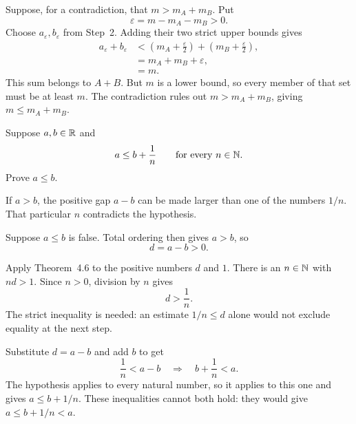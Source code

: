 Suppose, for a contradiction, that $m>m_A+m_B$. Put
\[
 \varepsilon=m-m_A-m_B>0.
\]
Choose $a_\varepsilon,b_\varepsilon$ from Step~2. Adding their two
strict upper bounds gives
\begin{align*}
 a_\varepsilon+b_\varepsilon
   &<\left(m_A+\frac\varepsilon2\right)
       +\left(m_B+\frac\varepsilon2\right),\\
   &=m_A+m_B+\varepsilon,\\
   &=m.
\end{align*}
This sum belongs to $A+B$. But $m$ is a lower bound, so every member
of that set must be at least $m$. The contradiction rules out
$m>m_A+m_B$, giving $m\le m_A+m_B$.



\goal Suppose $a,b\in\mathbb{R}$ and
\[
 a\le b+\frac1n\qquad\text{for every }n\in\mathbb{N}.
\]
Prove $a\le b$.

\idea If $a>b$, the positive gap $a-b$ can be made larger than one
of the numbers $1/n$. That particular $n$ contradicts the hypothesis.

Suppose $a\le b$ is false. Total ordering then gives $a>b$, so
\[
 d=a-b>0.
\]

Apply Theorem~4.6 to the positive numbers $d$ and $1$. There is an
$n\in\mathbb{N}$ with $nd>1$. Since $n>0$, division by $n$ gives
\[
 d>\frac1n.
\]
The strict inequality is needed: an estimate $1/n\le d$ alone would
not exclude equality at the next step.

Substitute $d=a-b$ and add $b$ to get
\[
 \frac1n<a-b\quad\Longrightarrow\quad b+\frac1n<a.
\]
The hypothesis applies to every natural number, so it applies to this
one and gives $a\le b+1/n$. These inequalities cannot both hold:
they would give $a\le b+1/n<a$.


